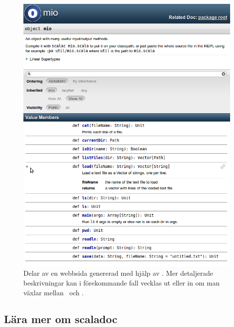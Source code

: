 \begin{figure}[t]
\includegraphics[width=1.0\textwidth]{../img/scaladoc/scaladoc-mio}
    \caption{Delar av en webbsida genererad med hjälp av \scaladoc. Mer detaljerade beskrivningar kan i förekommande fall vecklas ut eller in om man växlar mellan \Forward~och \MoveDown.}
    \label{fig:scaladoc:webpage}
\end{figure}


\subsection{Lära mer om scaladoc}

